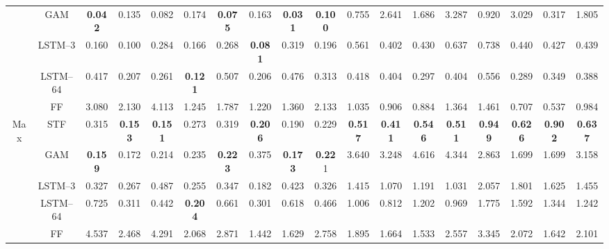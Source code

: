 \begin{table}[]
{\begin{tabular}{cc|c|c|c|c|c|c|c|c||c|c|c|c|c|c|c|c|}
\multicolumn{1}{|c|}{} &
  GAM \cite{gaz2019dynamic} &
  \textbf{0.042} &
  0.135 &
  0.082 &
  0.174 &
  \textbf{0.075} &
  0.163 &
  \textbf{0.031} &
  \textbf{0.100}&
  0.755 &
  2.641 &
  1.686 &
  3.287 &
  0.920 &
  3.029 &
  0.317 &
  1.805\\
\multicolumn{1}{|c|}{} &
  LSTM--3 &
  0.160 &
0.100  &
0.284  &
0.166  &
0.268  &
\textbf{0.081}  &
0.319  &
0.196 &
0.561  &
0.402  &
0.430  &
0.637  &
0.738  &
0.440  &
0.427 &
0.439\\
\multicolumn{1}{|c|}{} &
  LSTM--64 &
0.417  &
0.207  &
0.261  &
\textbf{0.121}  &
0.507  &
0.206  &
0.476  &
0.313 &
0.418  &
0.404  &
0.297  &
0.404  &
0.556  &
0.289  &
0.349 &
0.388\\
\multicolumn{1}{|c|}{} &
  FF \cite{goldfain2019autorally} &
  3.080 &
  2.130 &
  4.113 &
  1.245 &
  1.787 &
  1.220 &
  1.360 &
  2.133&
  1.035 &
  0.906 &
  0.884 &
  1.364 &
  1.461 &
  0.707 &
  0.537 &
  0.984\\ \hline
\multicolumn{1}{|c|}{\multirow{4}{*}{Max}} &
  STF \cite{grigsby2021longrange} &
  0.315 &
  \textbf{0.153} &
  \textbf{0.151} &
  0.273 &
  0.319 &
  \textbf{0.206} &
  0.190 &
  0.229&
  \textbf{0.517} &
  \textbf{0.411} &
  \textbf{0.546} &
  \textbf{0.511} &
  \textbf{0.949} &
  \textbf{0.626} &
  \textbf{0.902}&
  \textbf{0.637}\\
\multicolumn{1}{|c|}{} &
  GAM \cite{gaz2019dynamic} &
  \textbf{0.159} &
  0.172 &
  0.214 &
  0.235 &
  \textbf{0.223} &
  0.375 &
  \textbf{0.173} &
 \textbf{0.22}1&
  3.640 &
  3.248 &
  4.616 &
  4.344 &
  2.863 &
  1.699 &
  1.699 &
  3.158\\
\multicolumn{1}{|c|}{} &
  LSTM--3 &
  0.327  &
0.267  &
0.487  &
0.255  &
0.347  &
0.182  &
0.423  &
0.326&
1.415  &
1.070  &
1.191  &
1.031  &
2.057  &
1.801  &
1.625  &
1.455 \\
\multicolumn{1}{|c|}{} &
  LSTM--64 &
0.725  &
0.311  &
0.442  &
\textbf{0.204}  &
0.661  &
0.301  &
0.618  &
0.466&
1.006  &
0.812  &
1.202  &
0.969  &
1.775  &
1.592  &
1.344  &
1.242\\
\multicolumn{1}{|c|}{} &
  FF \cite{goldfain2019autorally} &
  4.537 &
  2.468 &
  4.291 &
  2.068 &
  2.871 &
  1.442 &
  1.629 &
  2.758&
  1.895 &
  1.664 &
  1.533 &
  2.557 &
  3.345 &
  2.072 &
  1.642 &
  2.101\\ \hline
\end{tabular}}

\label{table:arm_results}
\end{table}

